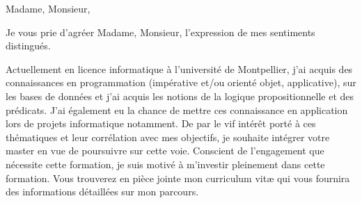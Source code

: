 \documentclass[11pt,a4paper,sans]{moderncv}
\begin{document}
\date{\today}
\opening{Madame, Monsieur,}
\closing{Je vous prie d'agréer Madame, Monsieur, l'expression de mes sentiments distingués.}
\makelettertitle
Actuellement en licence informatique à l'université de Montpellier, j’ai acquis des connaissances en programmation (impérative et/ou orienté objet, applicative), sur les bases de données et j'ai acquis les notions de la logique propositionnelle et des prédicats.  J'ai également eu la chance de mettre ces connaissance en application lors de projets informatique notamment.
De par le vif intérêt porté à ces thématiques et leur corrélation avec mes objectifs, je souhaite intégrer votre master en vue de poursuivre sur cette voie.
Conscient de l’engagement que nécessite cette formation, je suis motivé à m’investir pleinement dans cette formation. Vous trouverez en pièce jointe mon curriculum vitæ qui vous fournira des informations détaillées sur mon parcours.
\makeletterclosing
\end{document}

